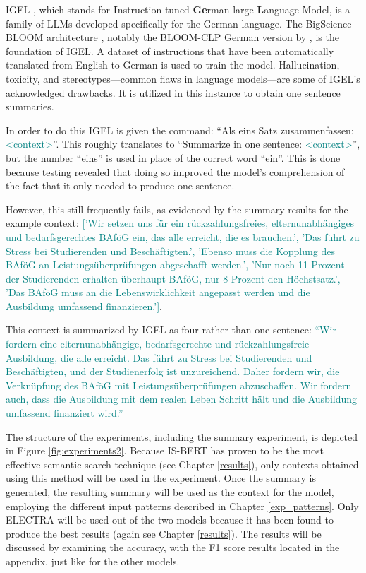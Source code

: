 IGEL \citep{igel}, which stands for \textbf{I}nstruction-tuned \textbf{Ge}rman large \textbf{L}anguage Model, is a family of LLMs developed specifically for the German language. The BigScience BLOOM architecture \citep{bloom}, notably the BLOOM-CLP German version by \citet{bloom-german}, is the foundation of IGEL. A dataset of instructions that have been automatically translated from English to German is used to train the model. Hallucination, toxicity, and stereotypes—common flaws in language models—are some of IGEL's acknowledged drawbacks. It is utilized in this instance to obtain one sentence summaries.

In order to do this IGEL is given the command: ``Als eins Satz zusammenfassen: \textcolor{teal}{<context>}''. This roughly translates to ``Summarize in one sentence: \textcolor{teal}{<context>}'', but the number ``eins'' is used in place of the correct word ``ein''. This is done because testing revealed that doing so improved the model's comprehension of the fact that it only needed to produce one sentence.

However, this still frequently fails, as evidenced by the summary results for the example context:
\textcolor{teal}{[’Wir setzen uns für ein rückzahlungsfreies, elternunabhängiges und bedarfsgerechtes BAföG ein, das alle erreicht, die es brauchen.’, ’Das führt zu Stress bei Studierenden und Beschäftigten.’, ’Ebenso muss die Kopplung des BAföG an Leistungsüberprüfungen abgeschafft werden.’, ’Nur noch 11 Prozent der Studierenden erhalten überhaupt BAföG, nur 8 Prozent den Höchstsatz.’, ’Das BAföG muss an die Lebenswirklichkeit angepasst werden und die Ausbildung umfassend finanzieren.’]}.

This context is summarized by IGEL as four rather than one sentence:
\textcolor{teal}{``Wir fordern eine elternunabhängige, bedarfsgerechte und rückzahlungsfreie Ausbildung, die alle erreicht. Das führt zu Stress bei Studierenden und Beschäftigten, und der Studienerfolg ist unzureichend. Daher fordern wir, die Verknüpfung des BAföG mit Leistungsüberprüfungen abzuschaffen. Wir fordern auch, dass die Ausbildung mit dem realen Leben Schritt hält und die Ausbildung umfassend finanziert wird.''}

The structure of the experiments, including the summary experiment, is depicted in Figure \ref{fig:experiments2}. Because IS-BERT has proven to be the most effective semantic search technique (see Chapter \ref{results}), only contexts obtained using this method will be used in the experiment. Once the summary is generated, the resulting summary will be used as the context for the model, employing the different input patterns described in Chapter \ref{exp_patterns}. Only ELECTRA will be used out of the two models because it has been found to produce the best results (again see Chapter \ref{results}). The results will be discussed by examining the accuracy, with the F1 score results located in the appendix, just like for the other models.

